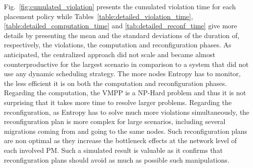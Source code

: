 


Fig.~\ref{fig:cumulated_violation} presents the cumulated violation
time for each placement policy while
Tables~\ref{table:detailed_violation_time},
\ref{table:detailed_computation_time} and
\ref{tab:detailed_reconf_time} give more details by presenting the
mean and the standard deviations of the duration of, respectively, the
violations, the computation and reconfiguration phases. As
anticipated, the centralized approach did not scale and became almost
counterproductive for the largest scenario in comparison to a system
that did not use any dynamic scheduling strategy. The more nodes Entropy has to
monitor, the less efficient it is on both the computation and
reconfiguration phases. Regarding the computation, the VMPP is a
NP-Hard problem and thus it is not surprising that it takes more time
to resolve larger problems. Regarding the reconfiguration, as Entropy
has to solve much more violations simultaneously, the reconfiguration plan
is more complex for large scenarios, including several migrations
coming from and going to the same nodes. Such reconfiguration plans
are non optimal as they increase the bottleneck effects at the network
level of each involved PM. Such a simulated result is valuable as it confirms
that reconfiguration plans should avoid as much as possible such
manipulations.

